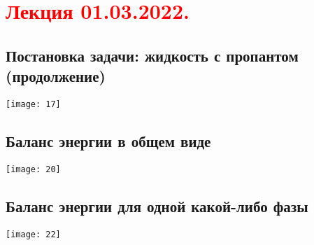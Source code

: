 \documentclass[main.tex]{subfiles}
\begin{document}
\section{\textcolor{red}{Лекция 01.03.2022.}}

\subsection{Постановка задачи: жидкость с пропантом (продолжение)}
\texttt{[image: 17]}



\subsection{Баланс энергии в общем виде}
\texttt{[image: 20]}


\subsection{Баланс энергии для одной какой-либо фазы}
\texttt{[image: 22]}
\end{document}
